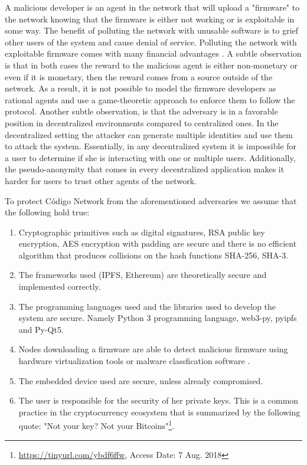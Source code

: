 {{A malicious developer is an agent in the network that will upload a "firmware" to the network knowing that the firmware is either not working or is exploitable in some way. The benefit of polluting the network with unusable software is to grief other users of the system and cause denial of service. Polluting the network with exploitable firmware comes with many financial advantages \cite{Classen2018AnatomyFirmware}. A subtle observation is that in both cases the reward to the malicious agent is either non-monetary or even if it is monetary, then the reward comes from a source outside of the network. As a result, it is not possible to model the firmware developers as rational agents and use a game-theoretic approach to enforce them to follow the protocol. Another subtle observation, is that the adversary is in a favorable position in decentralized environments compared to centralized ones. In the decentralized setting the attacker can generate multiple identities and use them  to attack the system. Essentially, in any decentralized system it is impossible for a user to determine if she is interacting with one or multiple users. Additionally, the pseudo-anonymity that comes in every decentralized application makes it harder for users to trust other agents of the network.


To protect Código Network from the aforementioned adversaries we assume that the following hold true:
\begin{enumerate}
\item Cryptographic primitives such as digital signatures, RSA public key encryption, AES encryption with padding are secure and there is no efficient algorithm that produces collisions on the hash functions SHA-256, SHA-3.
\item The frameworks used (IPFS, Ethereum) are theoretically secure and implemented correctly.
\item The programming languages used and the libraries used to develop the system are secure. Namely Python 3 programming language, web3-py, pyipfs and Py-Qt5.
\item \label{ref:curation} Nodes downloading a firmware are able to detect malicious firmware using hardware virtualization tools \cite{SpinkThomas2017Echv} or malware classfication software \cite{aspinall}.
\item The embedded device used are secure, unless already compromised.
\item The user is responsible for the security of her private keys. This is a common practice in the cryptocurrency ecosystem that is summarized by the following quote: "Not your key? Not your Bitcoins"\footnote{\url{https://tinyurl.com/ybdf6ffw}, Access Date: 7 Aug. 2018}.
\end{enumerate}

}}
